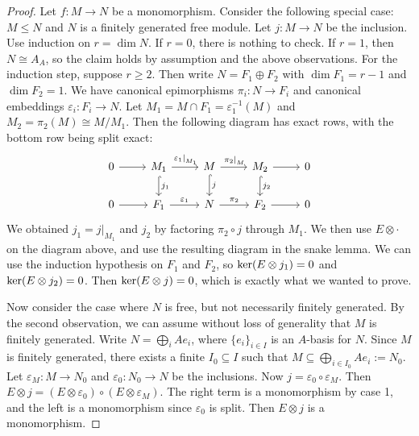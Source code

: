 \begin{proof}
  Let $f: M \to N$ be a monomorphism.
  Consider the following special case: $M \le N$ and $N$ is a finitely generated
  free module.
  Let $j: M \to N$ be the inclusion.
  Use induction on $r = \dim N$.
  If $r = 0$, there is nothing to check.
  If $r = 1$, then $N \cong A_A$, so the claim holds by assumption and the above
  observations.
  For the induction step, suppose $r \ge 2$.
  Then write $N = F_1 \oplus F_2$ with $\dim F_1 = r-1$ and $\dim F_2 = 1$.
  We have canonical epimorphisms $\pi_i: N \to F_i$ and canonical embeddings
  $\varepsilon_i: F_i \to N$.
  Let $M_1 = M \cap F_1 = \varepsilon_1^{-1}(M)$ and $M_2 = \pi_2(M) \cong M /
  M_1$.
  Then the following diagram has exact rows, with the bottom row being split
  exact:
  \[\begin{tikzcd}
	  0 & {M_1} & M & {M_2} & 0 \\
	  0 & {F_1} & N & {F_2} & 0
	  \arrow[from=1-1, to=1-2]
	  \arrow["{\left. \varepsilon_1 \right|_{M_1}}", from=1-2, to=1-3]
	  \arrow["j_1", hook, from=1-2, to=2-2]
	  \arrow["{\left. \pi_2 \right|_M}", from=1-3, to=1-4]
	  \arrow["j", hook, from=1-3, to=2-3]
	  \arrow[from=1-4, to=1-5]
	  \arrow["{j_2}", hook, from=1-4, to=2-4]
	  \arrow[from=2-1, to=2-2]
	  \arrow["{\varepsilon_1}", from=2-2, to=2-3]
	  \arrow["{\pi_2}", from=2-3, to=2-4]
	  \arrow[from=2-4, to=2-5]
	\end{tikzcd}\]
  We obtained $j_1 = \left. j \right|_{M_1}$ and $j_2$ by factoring $\pi_2 \circ
  j$ through $M_1$.
  We then use $E \otimes \cdot$ on the diagram above, and use the resulting
  diagram in the snake lemma.
  We can use the induction hypothesis on $F_1$ and $F_2$, so $\operatorname{ker}(E \otimes
  j_1) = 0$ and $\operatorname{ker} (E \otimes j_2) = 0$.
  Then $\operatorname{ker} (E \otimes j) = 0$, which is exactly what we wanted to prove.

  Now consider the case where $N$ is free, but not necessarily finitely
  generated.
  By the second observation, we can assume without loss of generality that $M$
  is finitely generated.
  Write $N = \bigoplus_i A e_i$, where $\{e_i\}_{i \in I}$ is an $A$-basis for
  $N$.
  Since $M$ is finitely generated, there exists a finite $I_0 \subseteq I$ such
  that $M \subseteq \bigoplus_{i \in I_0} A e_i := N_0$.
  Let $\varepsilon_M: M \to N_0$ and $\varepsilon_0 : N_0 \to N$ be the
  inclusions.
  Now $j = \varepsilon_0 \circ \varepsilon_M$.
  Then $E \otimes j = (E \otimes \varepsilon_0) \circ (E \otimes
  \varepsilon_M)$.
  The right term is a monomorphism by case 1, and the left is a monomorphism
  since $\varepsilon_0$ is split.
  Then $E \otimes j$ is a monomorphism.


\end{proof}
